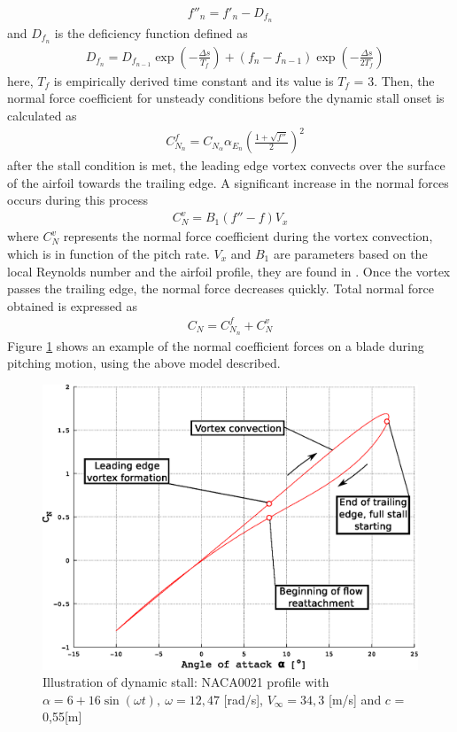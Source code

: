 \documentclass[a4paper]{jpconf}
\begin{document}
\begin{align}
f''_n = f'_n - D _{f_n}	   \label{dyndelay}
\end{align}
and $D_{f_n}$ is the deficiency function defined as
\begin{align}
& D_{f_n} = D_{f_{n-1}} \exp \left( - \frac{\Delta s}{T_f} \right) + (f_n - f_{n-1})\exp \left( - \frac{\Delta s}{2T_f} \right) \label{deff}
\end{align}
here, $T_f$ is empirically derived time constant and its value is $T_f$ = 3. Then, the normal force coefficient for unsteady conditions before the dynamic stall onset is calculated as
\begin{align}
& C_{N_n}^f = C_{N_\alpha} \alpha_{E_n} \left( \frac{1 + \sqrt{f''}}{2} \right)^2	\label{CNf}
\end{align}
after the stall condition is met, the leading edge vortex convects over the surface of the airfoil towards the trailing edge. A significant increase in the normal forces occurs during this process
\begin{align}
C_N^v = B_1 (f'' - f) V_x \label{CNv}
\end{align}
where $C_N^v$ represents the normal force coefficient during the vortex convection, which is in function of the pitch rate. $V_x$ and $B_1$ are parameters based on the local Reynolds number and the airfoil profile, they are found in \cite{dyachuk2013dynamic}. Once the vortex passes the trailing edge, the normal force decreases quickly. Total normal force obtained is expressed as
\begin{align}
C_N = C_{N_n}^f + C_N^v \label{CNtotal}
\end{align}
Figure \ref{figpitching} shows an example of the normal coefficient forces on a blade during pitching motion, using the above model described.

\begin{figure}[h]
\begin{center}
\includegraphics[width=0.5\columnwidth]{CNpitching2.eps}
\end{center}
\caption{\label{figpitching} Illustration of dynamic stall: NACA0021 profile with $\alpha=6 + 16 \sin (\omega	t), \ \omega=12,47$ [rad/s], $V_\infty=34,3$ [m/s] and $c$ = 0,55[m]}
\end{figure}
\end{document}
